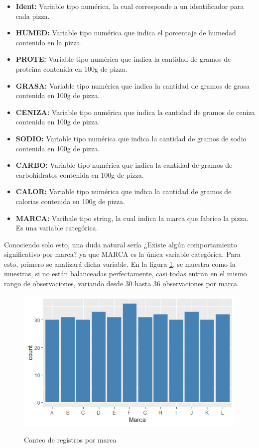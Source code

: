 \documentclass[12pt, letterpaper]{article}
\begin{document}
\begin{itemize}
\item \textbf{Ident:} Variable tipo numérica, la cual corresponde a un identificador para cada pizza.
\item \textbf{HUMED:} Variable tipo numérica que indica el porcentaje de humedad contenido en la pizza.
\item \textbf{PROTE:} Variable tipo numérica que indica la cantidad de gramos de proteina contenida en 100g de pizza.
\item \textbf{GRASA:} Variable tipo numérica que indica la cantidad de gramos de grasa contenida en 100g de pizza.
\item \textbf{CENIZA:} Variable tipo numérica que indica la cantidad de gramos de ceniza contenida en 100g de pizza.
\item \textbf{SODIO:} Variable tipo numérica que indica la cantidad de gramos de sodio contenida en 100g de pizza.
\item \textbf{CARBO:} Variable tipo numérica que indica la cantidad de gramos de carbohidratos contenida en 100g de pizza.
\item \textbf{CALOR:} Variable tipo numérica que indica la cantidad de gramos de calorias contenida en 100g de pizza.
\item \textbf{MARCA:} Varibale tipo string, la cual indica la marca que fabrico la pizza. Es una variable categórica.
\end{itemize}

Conociendo solo esto, una duda natural sería ¿Existe algún comportamiento significativo por marca? ya que MARCA es la única variable categórica. Para esto, primero se analizará dicha variable. En la figura \ref{i1}, se muestra como la muestras, si no están balanceadas perfectamente, casi todas entran en el mismo rango de observaciones, variando desde 30 hasta 36 observaciones por marca.\\

\begin{figure}[h]
\centering
\includegraphics[scale=1]{images/marca.png} 
\label{i1}
\caption{Conteo de registros por marca}
\end{figure}
\end{document}
